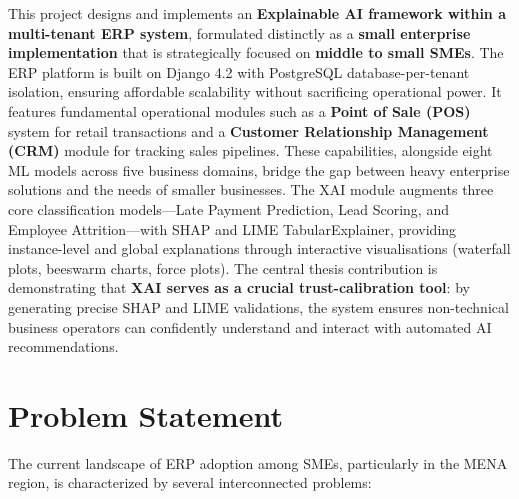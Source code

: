 \documentclass[12pt,a4paper]{report}
\begin{document}
This project designs and implements an \textbf{Explainable AI framework within a multi-tenant ERP system}, formulated distinctly as a \textbf{small enterprise implementation} that is strategically focused on \textbf{middle to small SMEs}. The ERP platform is built on Django 4.2 with PostgreSQL database-per-tenant isolation, ensuring affordable scalability without sacrificing operational power. It features fundamental operational modules such as a \textbf{Point of Sale (POS)} system for retail transactions and a \textbf{Customer Relationship Management (CRM)} module for tracking sales pipelines. These capabilities, alongside eight ML models across five business domains, bridge the gap between heavy enterprise solutions and the needs of smaller businesses. The XAI module augments three core classification models---Late Payment Prediction, Lead Scoring, and Employee Attrition---with SHAP and LIME TabularExplainer, providing instance-level and global explanations through interactive visualisations (waterfall plots, beeswarm charts, force plots). The central thesis contribution is demonstrating that \textbf{XAI serves as a crucial trust-calibration tool}: by generating precise SHAP and LIME validations, the system ensures non-technical business operators can confidently understand and interact with automated AI recommendations.

\section{Problem Statement}
\label{sec:problem_statement}

The current landscape of ERP adoption among SMEs, particularly in the MENA region, is characterized by several interconnected problems:
\end{document}

